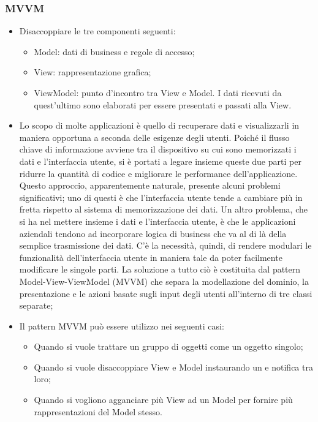 \subsubsection{MVVM} 
\begin{itemize}
\item {} Disaccoppiare le tre componenti seguenti:
\begin{itemize}
\item Model: dati di business e regole di accesso;
\item View: rappresentazione grafica;
\item ViewModel: punto d'incontro tra View e Model. I dati ricevuti da quest'ultimo sono elaborati per essere presentati e passati alla View.
\end{itemize}
\item {} Lo scopo di molte applicazioni è quello di recuperare dati e visualizzarli in maniera opportuna a seconda delle esigenze degli utenti. Poiché il flusso chiave di informazione avviene tra il dispositivo su cui sono memorizzati i dati e l'interfaccia utente, si è portati a legare insieme queste due parti per ridurre la quantità di codice e migliorare le performance dell'applicazione. Questo approccio, apparentemente naturale, presente alcuni problemi significativi; uno di questi è che l'interfaccia utente tende a cambiare più in fretta rispetto al sistema di memorizzazione dei dati. Un altro problema, che si ha nel mettere insieme i dati e l'interfaccia utente, è che le applicazioni aziendali tendono ad incorporare logica di business che va al di là della semplice trasmissione dei dati. C'è la necessità, quindi, di rendere modulari le funzionalità dell'interfaccia utente in maniera tale da poter facilmente modificare le singole parti. La soluzione a tutto ciò è costituita dal pattern Model-View-ViewModel (MVVM) che separa la modellazione del dominio, la presentazione e le azioni basate sugli input degli utenti all'interno di tre classi separate;
\item {} Il pattern MVVM può essere utilizzo nei seguenti casi:
\begin{itemize}
\item Quando si vuole trattare un gruppo di oggetti come un oggetto singolo;
\item Quando si vuole disaccoppiare View e Model instaurando un  e notifica tra loro;
\item Quando si vogliono agganciare più View ad un Model per fornire più rappresentazioni del Model stesso.
\end{itemize}
\end{itemize}

